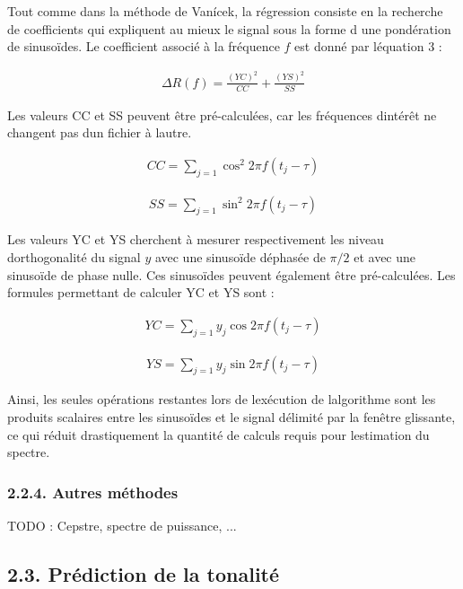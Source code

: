 \documentclass[letterpaper]{article}
\begin{document}
Tout comme dans la méthode de Vanícek, la régression consiste en la recherche de coefficients qui expliquent au mieux le signal sous la forme d\textquotesingle
une pondération de sinusoïdes. Le coefficient associé à la fréquence $f$ est donné par l\textquotesingle équation 3 :

\begin{align}
\Delta R(f) = \frac{(YC)^{2}}{CC} 
+ \frac{(YS)^{2}}{SS}
\end{align}

Les valeurs CC et SS peuvent être pré-calculées, car les fréquences d\textquotesingle intérêt ne changent pas d\textquotesingle un fichier
à l\textquotesingle autre.

\begin{align}
CC = \sum\limits_{j=1} \cos^{2} 2\pi f (t_{j} - \tau)
\end{align}

\begin{align}
SS = \sum\limits_{j=1} \sin^{2} 2\pi f (t_{j} - \tau)
\end{align}

Les valeurs YC et YS cherchent à mesurer respectivement les niveau d\textquotesingle orthogonalité du signal $y$ avec une sinusoïde déphasée de $\pi / 2$
et avec une sinusoïde de phase nulle. Ces sinusoïdes peuvent également être pré-calculées. Les formules permettant de calculer YC et YS sont :

\begin{align}
YC = \sum\limits_{j=1} y_{j}\cos 2\pi f (t_{j} - \tau)
\end{align}

\begin{align}
YS = \sum\limits_{j=1} y_{j}\sin 2\pi f (t_{j} - \tau)
\end{align}

Ainsi, les seules opérations restantes lors de l\textquotesingle exécution de l\textquotesingle algorithme sont les produits scalaires entre les
sinusoïdes et le signal délimité par la fenêtre glissante, ce qui réduit drastiquement la quantité de calculs requis pour l\textquotesingle estimation du spectre.

\subsubsection*{2.2.4. Autres méthodes}

TODO : Cepstre, spectre de puissance, ...

\subsection*{2.3. Prédiction de la tonalité}
\end{document}
